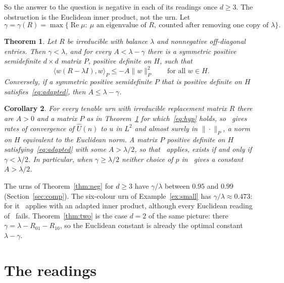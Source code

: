 \documentclass[11pt]{amsart}
\newtheorem{theorem}{Theorem}[section]
\newtheorem{corollary}[theorem]{Corollary}
\theoremstyle{definition}
\theoremstyle{remark}
\DeclareMathOperator{\Real}{Re}
\begin{document}
So the answer to the question is negative in each of its readings once $d\ge3$. The obstruction is the Euclidean inner product, not the urn. Let
\[
\gamma=\gamma(R)=\max\{\Real\mu:\ \mu \text{ an eigenvalue of } R,\ \text{counted after removing one copy of }\lambda\}.
\]

\begin{theorem}\label{thm:adapted}
Let $R$ be irreducible with balance $\lambda$ and nonnegative off-diagonal entries. Then $\gamma<\lambda$, and for every $A<\lambda-\gamma$ there is a symmetric positive semidefinite $d\times d$ matrix $P$, positive definite on $H$, such that
\begin{equation}\label{eq:adapted}
\langle w(R-\lambda I),w\rangle_P\le -A\|w\|_P^2\qquad\text{for all }w\in H.
\end{equation}
Conversely, if a symmetric positive semidefinite $P$ that is positive definite on $H$ satisfies~\eqref{eq:adapted}, then $A\le\lambda-\gamma$.
\end{theorem}

\begin{corollary}\label{cor:rates}
For every tenable urn with irreducible replacement matrix $R$ there are $A>0$ and a matrix $P$ as in Theorem~\ref{thm:adapted} for which~\eqref{eq:hyp} holds, so~\cite[Theorem~3.2]{NP} gives rates of convergence of $\widehat U(n)$ to $u$ in $L^2$ and almost surely in $\|\cdot\|_P$, a norm on $H$ equivalent to the Euclidean norm. A matrix $P$ positive definite on $H$ satisfying~\eqref{eq:adapted} with some $A>\lambda/2$, so that~\cite[Theorem~3.3]{NP} applies, exists if and only if $\gamma<\lambda/2$. In particular, when $\gamma\ge\lambda/2$ neither choice of $p$ in~\cite[Proposition~3.6]{NP} gives a constant $A>\lambda/2$.
\end{corollary}

The urns of Theorem~\ref{thm:neg} for $d\ge 3$ have $\gamma/\lambda$ between $0.95$ and $0.99$ (Section~\ref{sec:comp}). The six-colour urn of Example~\ref{ex:small} has $\gamma/\lambda\approx 0.473$: for it~\cite[Theorem~3.3]{NP} applies with an adapted inner product, although every Euclidean reading of~\cite[Proposition~3.6]{NP} fails. Theorem~\ref{thm:two} is the case $d=2$ of the same picture: there $\gamma=\lambda-R_{01}-R_{10}$, so the Euclidean constant is already the optimal constant $\lambda-\gamma$.

\section{The readings}\label{sec:readings}
\end{document}
